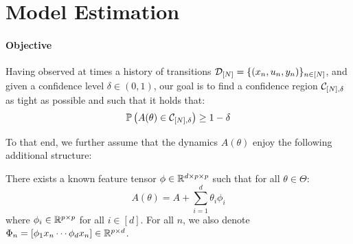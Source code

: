 \documentclass{article}
\begin{document}
\section{Model Estimation}

\label{sec:estimation}

\paragraph{Objective}
Having observed at times a history of transitions $\mathcal{D}_{[N]} = \{(x_n, u_n, y_n)\}_{n\in[N]}$, and given a confidence level $\delta\in(0, 1)$, our goal is to find a confidence region $\mathcal{C}_{[N],\delta}$ as tight as possible and such that it holds that:
\begin{align}
\mathbb{P}\left(A(\theta)\in \mathcal{C}_{[N],\delta}\right) \geq 1-\delta
\label{eq:polytope}
\end{align}



To that end, we further assume that the dynamics $A(\theta)$ enjoy the following additional structure:
\begin{assumption}
\label{assumpt:linear_param}
There exists a known feature tensor $\phi\in \mathbb{R}^{d \times p \times p}$ such that for all $\theta\in\Theta$:
\begin{equation}
    A(\theta) = A + %
    \sum_{i=1}^d \theta_i\phi_i
\end{equation}
where $\phi_i\in\mathbb{R}^{p\times p}$ for all $i\in[d]$. For all $n$, we also denote $\Phi_n = [\phi_1 x_n \cdots \phi_d x_n]\in\mathbb{R}^{p\times d}$.
\end{assumption}
\end{document}
